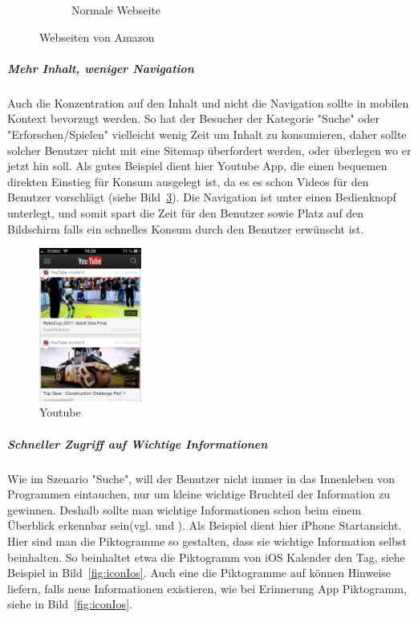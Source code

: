 \begin{figure}
\begin{subfigure}[b]{0.6\textwidth}
		\caption{Normale Webseite}\label{fig:amazonFull}
	\end{subfigure}
	\caption{Webseiten von Amazon}\label{fig:amazonSites}
\end{figure}

\subparagraph{Mehr Inhalt, weniger Navigation} 
\label{subp:entferne_das_fett} 

Auch die Konzentration auf den Inhalt und nicht die Navigation sollte in mobilen Kontext bevorzugt werden\cite[Seite 52]{mobileFirst}. So hat der Besucher der Kategorie "Suche" oder "Erforschen/Spielen" vielleicht wenig Zeit um Inhalt zu konsumieren, daher sollte  solcher Benutzer nicht mit eine Sitemap überfordert werden, oder überlegen wo er jetzt hin soll. Als gutes Beispiel dient hier Youtube App, die einen bequemen direkten Einstieg für Konsum ausgelegt ist, da es es schon Videos für den Benutzer vorschlägt (siehe Bild~\ref{fig:youtube}). Die Navigation ist unter einen Bedienknopf unterlegt, und somit spart die Zeit für den Benutzer sowie Platz auf den Bildschirm falls ein schnelles Konsum durch den Benutzer erwünscht ist.

\begin{figure}
	\begin{center}
	\includegraphics[width=0.3\textwidth]{img/youtube.png}
	\caption{Youtube}\label{fig:youtube}
\end{center}
\end{figure}

\subparagraph{Schneller Zugriff auf Wichtige Informationen} 
\label{subp:subparagraph_name}

Wie im Szenario "Suche", will der Benutzer nicht immer in das Innenleben von Programmen eintauchen, nur um kleine wichtige Bruchteil der Information zu gewinnen. Deshalb sollte man wichtige Informationen schon beim einem Überblick erkennbar sein(vgl. \cite[Seite 54]{mobileFrontier} und \cite{Neil:2012uf}). Als Beispiel dient hier iPhone Startansicht. Hier sind man die Piktogramme so gestalten, dass sie wichtige Information selbst beinhalten. So beinhaltet etwa die Piktogramm von iOS Kalender den Tag, siehe Beispiel in Bild~\ref{fig:iconIos}. Auch eine die Piktogramme auf können Hinweise liefern, falls neue Informationen existieren, wie bei Erinnerung App Piktogramm, siehe in Bild~\ref{fig:iconIos}.

